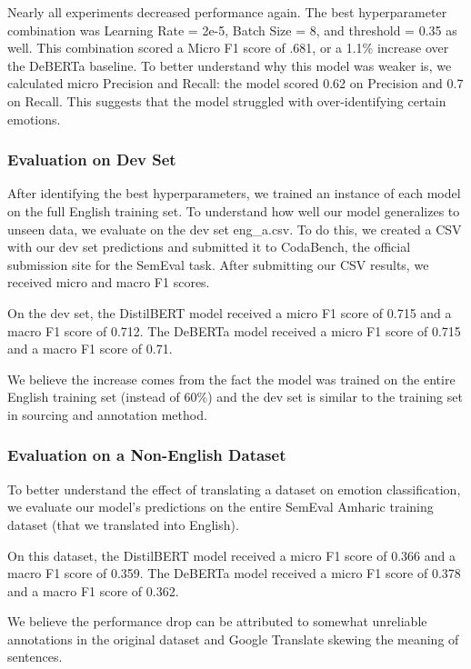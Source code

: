 \documentclass[11pt]{article}
\begin{document}
Nearly all experiments decreased performance again. The best hyperparameter combination was Learning Rate = 2e-5, Batch Size = 8, and threshold = 0.35 as well. This combination scored a Micro F1 score of .681, or a 1.1\% increase over the DeBERTa baseline. To better understand why this model was weaker is, we calculated micro Precision and Recall: the model scored 0.62 on Precision and 0.7 on Recall. This suggests that the model struggled with over-identifying certain emotions. 

\subsubsection{Evaluation on Dev Set}

After identifying the best hyperparameters, we trained an instance of each model on the full English training set. To understand how well our model generalizes to unseen data, we evaluate on the dev set eng\_a.csv. To do this, we created a CSV with our dev set predictions and submitted it to CodaBench, the official submission site for the SemEval task. After submitting our CSV results, we received micro and macro F1 scores.  

On the dev set, the DistilBERT model received a micro F1 score of 0.715 and a macro F1 score of 0.712. The DeBERTa model received a micro F1 score of 0.715 and a macro F1 score of 0.71.

We believe the increase comes from the fact the model was trained on the entire English training set (instead of 60\%) and the dev set is similar to the training set in sourcing and annotation method.


\subsubsection{Evaluation on a Non-English Dataset}

To better understand the effect of translating a dataset on emotion classification, we evaluate our model’s predictions on the entire SemEval Amharic training dataset (that we translated into English). 

On this dataset, the DistilBERT model received a micro F1 score of 0.366 and a macro F1 score of 0.359. The DeBERTa model received a micro F1 score of 0.378 and a macro F1 score of 0.362.

We believe the performance drop can be attributed to somewhat unreliable annotations in the original dataset and Google Translate skewing the meaning of sentences. 
\end{document}
